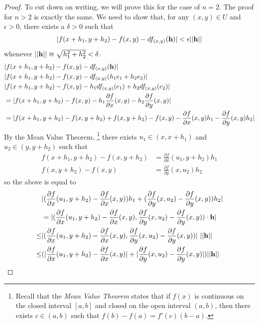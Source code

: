 \documentclass[12pt,letterpaper,reqno]{article}
\numberwithin{equation}{section}
\newcommand{\bh}{{\bf h}}
\begin{document}
{\begin{proof}
To cut down on writing, we will prove this for the case of $n=2$. The proof for $n>2$ is exactly the same. We need to show that, for any $(x,y) \in U$ and $\epsilon > 0$, there exists a $\delta > 0$ such that
\begin{align*}
	|f(x+h_1,y+h_2)-f(x,y)-df_{(x,y)}({\bf h})|<\epsilon||{\bf h}||
\end{align*}
whenever $||{\bf h}||\equiv \sqrt{h_1^2+h_2^2}< \delta$.  
\begin{align*}
	&|f(x+h_1,y+h_2)-f(x,y)-df_{(x,y)}({\bf h})|\\
	&|f(x+h_1,y+h_2)-f(x,y)-df_{(x,y)}(h_1e_1+h_2e_2)|\\
	&|f(x+h_1,y+h_2)-f(x,y)-h_1df_{(x,y)}(e_1)+h_2df_{(x,y)}(e_2)|\\
	&=|f(x+h_1,y+h_2)-f(x,y)-h_1\frac{\partial f}{\partial x}(x,y)-h_2\frac{\partial f}{\partial y}(x,y)| \\
	&=|f(x+h_1,y+h_2)-f(x,y+h_2)+f(x,y+h_2)-f(x,y)-\frac{\partial f}{\partial x}(x,y)h_1-\frac{\partial f}{\partial y}(x,y)h_2| \\
\end{align*}
By the Mean Value Theorem, \footnote{Recall that the \emph{Mean Value Theorem} states that if $f(x)$ is continuous on the closed interval $[a,b]$ and closed on the open interval $(a,b)$, then there exists $c \in (a,b)$ such that $f(b)-f(a)=f'(c)(b-a)$.} there exists $u_1 \in (x,x+h_1)$ and $u_2 \in (y,y+h_2)$ such that
\begin{align*}
	f(x+h_1,y+h_2)-f(x,y+h_2)&=\frac{\partial f}{\partial x}(u_1,y+h_2)h_1 \\
	f(x,y+h_2)-f(x,y)&=\frac{\partial f}{\partial y}(x,u_2)h_2
\end{align*}
so the above is equal to
\begin{align*}
	&|(\frac{\partial f}{\partial x}(u_1,y+h_2)-\frac{\partial f}{\partial x}(x,y))h_1+(\frac{\partial f}{\partial y}(x,u_2)-\frac{\partial f}{\partial y}(x,y))h_2|\\
	&=|(\frac{\partial f}{\partial x}(u_1,y+h_2)-\frac{\partial f}{\partial x}(x,y),\frac{\partial f}{\partial y}(x,u_2)-\frac{\partial f}{\partial y}(x,y))\cdot \bh| \\
	 \leq &|(\frac{\partial f}{\partial x}(u_1,y+h_2)-\frac{\partial f}{\partial x}(x,y), \frac{\partial f}{\partial y}(x,u_2)-\frac{\partial f}{\partial y}(x,y))| \ ||{\bf h}|| \\
	 \leq &(|\frac{\partial f}{\partial x}(u_1,y+h_2)-\frac{\partial f}{\partial x}(x,y)|+|\frac{\partial f}{\partial y}(x,u_2)-\frac{\partial f}{\partial y}(x,y)|)||{\bf h}||

\end{align*}
\end{proof}}
\end{document}
